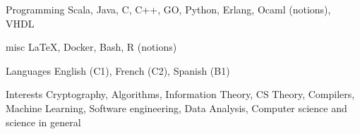 


\begin{cvskills}


\cvskill
{Programming} %
{Scala, Java, C, C++, GO, Python, Erlang, Ocaml (notions), VHDL} %


\cvskill
{misc} %
{\LaTeX, Docker, Bash, R (notions)} %


\cvskill
{Languages} %
{English (C1), French (C2), Spanish (B1)} %


\cvskill
{Interests} %
{Cryptography, Algorithms, Information Theory, CS Theory, Compilers, Machine Learning, Software engineering, Data Analysis, Computer science and science in general} %


\end{cvskills}